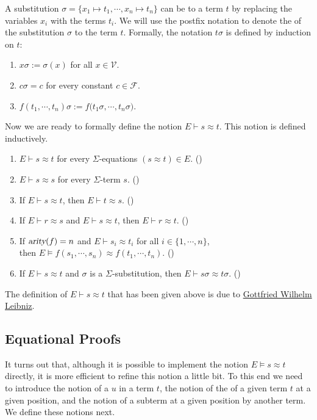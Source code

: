 A substitution $\sigma = \{ x_1 \mapsto t_1, \cdots, x_n \mapsto t_n \}$ can be  to a term $t$
by replacing the variables $x_i$ with the terms $t_i$.  We will use the postfix notation  to denote the
 of the substitution $\sigma$ to the term $t$.  Formally, the notation $t \sigma$ is defined
by induction on $t$:
\begin{enumerate}
\item $x \sigma := \sigma(x)$ \quad for all $x \in \mathcal{V}$.
\item $c \sigma = c$ \quad for every constant $c \in \mathcal{F}$.
\item $f(t_1, \cdots, t_n) \sigma := f\bigl(t_1\sigma, \cdots, t_n\sigma\bigr)$.
\end{enumerate}
Now we are ready to formally define the notion $E \vdash s \approx t$.  This notion is defined inductively.
\begin{enumerate}
\item $E \vdash s \approx t$ \quad for every $\Sigma$-equations $(s \approx t) \in E$. \hspace*{\fill} ()
\item $E \vdash s \approx s$ \quad for every $\Sigma$-term $s$. \hspace*{\fill} ()
\item If $E \vdash s \approx t$, then $E \vdash t \approx s$.  \hspace*{\fill} ()
\item If $E \vdash r \approx s$ and $E \vdash s \approx t$, then $E \vdash r \approx t$.  
      \hspace*{\fill} ()
\item If $\textsl{arity}(f) = n$ and $E \vdash s_i \approx t_i$ for all $i \in \{1,\cdots,n\}$, \\
      then $E \models f(s_1,\cdots,s_n) \approx f(t_1,\cdots,t_n)$.
      \hspace*{\fill} ()
\item If $E \vdash s \approx t$ and $\sigma$ is a $\Sigma$-substitution, then $E \vdash s\sigma \approx t\sigma$.
      \hspace*{\fill} ()
\end{enumerate}
The definition of $E \vdash s \approx t$ that has been given above is due to 
\href{https://en.wikipedia.org/wiki/Gottfried_Wilhelm_Leibniz}{Gottfried Wilhelm Leibniz}.

\subsection{Equational Proofs}
It turns out that, although it is possible to implement the notion $E \models s \approx t$ directly, it is more
efficient to refine this notion a little bit.  To this end we need to introduce the notion of a  $u$
in a term $t$, the notion of the  of a given term $t$ at a given position, and the notion of
 a subterm at a given position by another term.  We define these notions next.

